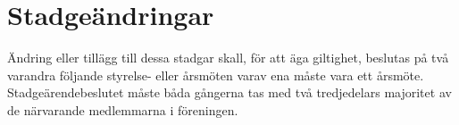 \section{Stadgeändringar}
Ändring eller tillägg till dessa stadgar skall, för att äga giltighet,
beslutas på två varandra följande styrelse- eller årsmöten varav ena måste
vara ett årsmöte. Stadgeärendebeslutet måste båda gångerna tas med två
tredjedelars majoritet av de närvarande medlemmarna i föreningen.

